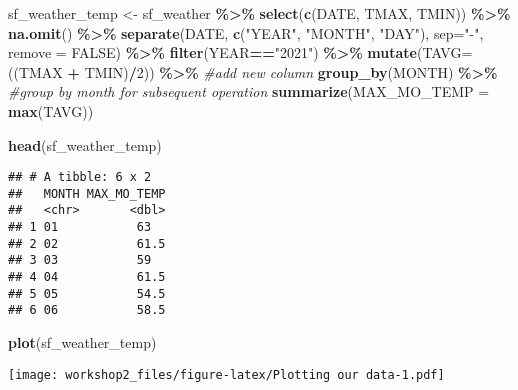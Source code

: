 \documentclass[
]{article}
\newenvironment{Shaded}{\begin{snugshade}}{\end{snugshade}}
\newcommand{\AttributeTok}[1]{\textcolor[rgb]{0.13,0.29,0.53}{#1}}
\newcommand{\CommentTok}[1]{\textcolor[rgb]{0.56,0.35,0.01}{\textit{#1}}}
\newcommand{\ConstantTok}[1]{\textcolor[rgb]{0.56,0.35,0.01}{#1}}
\newcommand{\DecValTok}[1]{\textcolor[rgb]{0.00,0.00,0.81}{#1}}
\newcommand{\FunctionTok}[1]{\textcolor[rgb]{0.13,0.29,0.53}{\textbf{#1}}}
\newcommand{\NormalTok}[1]{#1}
\newcommand{\OtherTok}[1]{\textcolor[rgb]{0.56,0.35,0.01}{#1}}
\newcommand{\SpecialCharTok}[1]{\textcolor[rgb]{0.81,0.36,0.00}{\textbf{#1}}}
\newcommand{\StringTok}[1]{\textcolor[rgb]{0.31,0.60,0.02}{#1}}
\begin{document}
\begin{Shaded}
\begin{Highlighting}[]
\NormalTok{sf\_weather\_temp }\OtherTok{\textless{}{-}}\NormalTok{ sf\_weather }\SpecialCharTok{\%\textgreater{}\%} 
  \FunctionTok{select}\NormalTok{(}\FunctionTok{c}\NormalTok{(DATE, TMAX, TMIN)) }\SpecialCharTok{\%\textgreater{}\%} 
  \FunctionTok{na.omit}\NormalTok{() }\SpecialCharTok{\%\textgreater{}\%} 
  \FunctionTok{separate}\NormalTok{(DATE, }\FunctionTok{c}\NormalTok{(}\StringTok{"YEAR"}\NormalTok{, }\StringTok{"MONTH"}\NormalTok{, }\StringTok{"DAY"}\NormalTok{), }\AttributeTok{sep=}\StringTok{"{-}"}\NormalTok{, }\AttributeTok{remove =} \ConstantTok{FALSE}\NormalTok{) }\SpecialCharTok{\%\textgreater{}\%} 
  \FunctionTok{filter}\NormalTok{(YEAR}\SpecialCharTok{==}\StringTok{"2021"}\NormalTok{) }\SpecialCharTok{\%\textgreater{}\%} 
  \FunctionTok{mutate}\NormalTok{(}\AttributeTok{TAVG=}\NormalTok{((TMAX }\SpecialCharTok{+}\NormalTok{ TMIN)}\SpecialCharTok{/}\DecValTok{2}\NormalTok{)) }\SpecialCharTok{\%\textgreater{}\%} \CommentTok{\#add new column }
  \FunctionTok{group\_by}\NormalTok{(MONTH) }\SpecialCharTok{\%\textgreater{}\%} \CommentTok{\#group by month for subsequent operation}
  \FunctionTok{summarize}\NormalTok{(}\AttributeTok{MAX\_MO\_TEMP =} \FunctionTok{max}\NormalTok{(TAVG))}


\FunctionTok{head}\NormalTok{(sf\_weather\_temp)}
\end{Highlighting}
\end{Shaded}

\begin{verbatim}
## # A tibble: 6 x 2
##   MONTH MAX_MO_TEMP
##   <chr>       <dbl>
## 1 01           63  
## 2 02           61.5
## 3 03           59  
## 4 04           61.5
## 5 05           54.5
## 6 06           58.5
\end{verbatim}

\begin{Shaded}
\begin{Highlighting}[]
\FunctionTok{plot}\NormalTok{(sf\_weather\_temp)}
\end{Highlighting}
\end{Shaded}

\texttt{[image: workshop2\_files/figure-latex/Plotting our data-1.pdf]}
\end{document}
